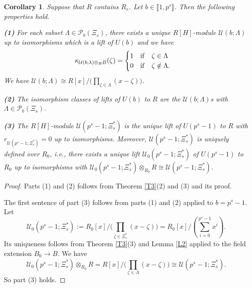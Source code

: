 \documentclass[11pt]{amsart}
\newtheorem{corollary}[theorem]{Corollary}
\begin{document}
\begin{corollary}\label{C1}
Suppose that $R$ contains $R_s$. Let $b\in\llbracket1,p^s\rrbracket$. Then the following properties hold.

\medskip
{\bf (1)} For each subset $\Lambda\in\mathcal P_b(\Xi_s)$, there exists a unique $R[H]$-module $\mathcal U(b;\Lambda)$ up to isomorphisms which is a lift of $U(b)$ and we have 
$$\kappa_{\mathcal U(b;\lambda)\otimes_R B}(\zeta)=\begin{cases}1\quad {\rm if}\quad \zeta\in\Lambda\\
0\quad {\rm if}\quad \zeta\notin\Lambda.\end{cases}$$ 
We have $\mathcal U(b;\Lambda)\cong R[x]/\bigl(\prod_{\zeta\in\Lambda} (x-\zeta)\bigr)$.

\smallskip
{\bf (2)} The isomorphism classes of lifts of $U(b)$ to $R$ are the $\mathcal U(b;\Lambda)$s with $\Lambda\in\mathcal P_b(\Xi_s)$.

\smallskip
{\bf (3)} The $R[H]$-module $\mathcal U(p^s-1;\Xi_s^{\ast})$ is the unique lift of $U(p^s-1)$ to $R$ with $r_{\mathcal U(p^s-1;\Xi_s^{\ast})}=0$ up to isomorphisms. Moreover, $\mathcal U(p^s-1;\Xi_s^{\ast})$ is uniquely defined over $R_0$, i.e., there exists a unique lift $\mathcal U_0(p^s-1;\Xi_s^{\ast})$ of $U(p^s-1)$ to $R_0$ up to isomorphisms with $\mathcal U_0(p^s-1;\Xi_s^{\ast})\otimes_{R_0} R\cong \mathcal U(p^s-1;\Xi_s^{\ast})$.
\end{corollary}

\begin{proof}
Parts (1) and (2) follows from Theorem \ref{T3}(2) and (3) and its proof. 

The first sentence of part (3) follows from parts (1) and (2) applied to $b=p^s-1$. Let
\begin{equation}\label{EQ32}
\mathcal U_0(p^s-1;\Xi_s^{\ast}):=R_0[x]/\bigl(\prod_{\zeta\in\Xi_s^{\ast}} (x-\zeta)\bigr)=R_0[x]/(\sum_{i=0}^{p^s-1} x^i).
\end{equation}
Its uniqueness follows from Theorem \ref{T3}(3) and Lemma \ref{L2} applied to the field extension $B_0\rightarrow B$. We have 
$$\mathcal U_0(p^s-1;\Xi_s^{\ast})\otimes_{R_0} R=R[x]/\bigl(\prod_{\zeta\in\Lambda} (x-\zeta)\bigr)\cong \mathcal U(p^s-1;\Xi_s^{\ast}).$$ So part (3) holds.
\end{proof}
\end{document}
